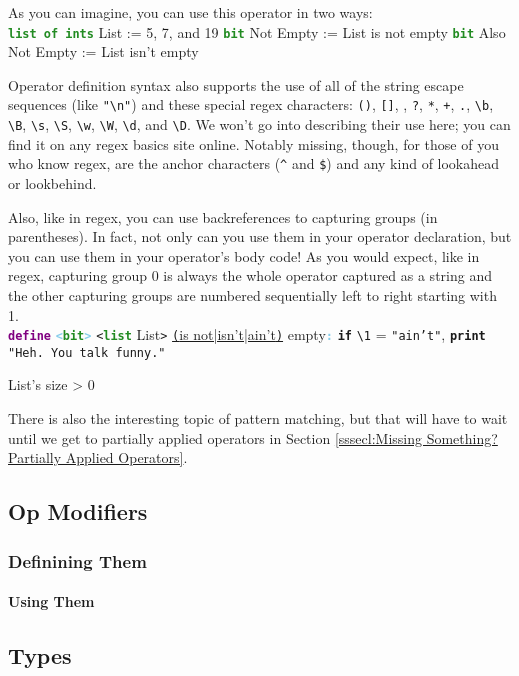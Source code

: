 \documentclass{article}
\newcommand{\ssecl}[1]{\subsection{#1}\label{ssec:#1}}
\newcommand{\sssecl}[1]{\subsubsection{#1}\label{sssec:#1}}
\newcommand{\type}[1]{\texttt{\textcolor{ForestGreen}{\textbf{#1}}}}
\newcommand{\keyop}[1]{\texttt{\textcolor{Purple}{\textbf{#1}}}}
\newcommand{\common}[1]{\texttt{\textcolor{Mulberry}{\textbf{#1}}}}
\newcommand{\defpunct}[1]{\texttt{\textcolor{SkyBlue}{\textbf{#1}}}}
\newcommand{\codespecial}[1]{\texttt{\textcolor{CarnationPink}{#1}}}
\newcommand{\codestring}[1]{\texttt{\textcolor{NavyBlue}{"#1"}}}
\newenvironment{code}[0]
{\ttfamily{}				%
\setlength\parindent{0cm}	%
~\\}
{\setlength\parindent{1cm}
~\\}
\begin{document}
\indent As you can imagine, you can use this operator in two ways:
\begin{code}
\type{list of ints} List := 5, 7, and 19
\type{bit} Not Empty := List is not empty
\type{bit} Also Not Empty := List isn't empty
\end{code}

\indent Operator definition syntax also supports the use of all of the string escape sequences (like \codestring{\textbackslash{}n}) and these special regex characters: \codespecial{()}, \codespecial{[]}, \codespecial{{}}, \codespecial{?}, \codespecial{*}, \codespecial{+}, \codespecial{.}, \codespecial{\textbackslash{}b}, \codespecial{\textbackslash{}B}, \codespecial{\textbackslash{}s}, \codespecial{\textbackslash{}S}, \codespecial{\textbackslash{}w}, \codespecial{\textbackslash{}W}, \codespecial{\textbackslash{}d}, and \codespecial{\textbackslash{}D}. We won't go into describing their use here; you can find it on any regex basics site online. Notably missing, though, for those of you who know regex, are the anchor characters (\codespecial{\textasciicircum} and \codespecial{\$}) and any kind of lookahead or lookbehind.

\indent Also, like in regex, you can use backreferences to capturing groups (in parentheses). In fact, not only can you use them in your operator declaration, but you can use them in your operator's body code! As you would expect, like in regex, capturing group 0 is always the whole operator captured as a string and the other capturing groups are numbered sequentially left to right starting with 1.
\begin{code}
\keyop{define} \defpunct{<}\type{bit}\defpunct{>} \codespecial{<}\type{list} List\codespecial{>} \underline{\codespecial{(}is not|isn't|ain't\codespecial{)}} empty\defpunct{:}
\qquad{}\common{if} \codespecial{\textbackslash{}1} = \codestring{ain't},
\qquad{}\qquad{}\common{print} \codestring{Heh. You talk funny.}

\qquad{}List's size > 0
\end{code}

\indent There is also the interesting topic of pattern matching, but that will have to wait until we get to partially applied operators in Section \ref{sssecl:Missing Something? Partially Applied Operators}.

\ssecl{Op Modifiers}
\sssecl{Definining Them}
\paragraph{Using Them}
\ssecl{Types}
\end{document}
